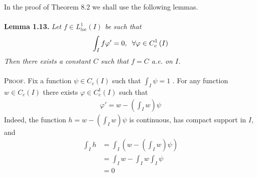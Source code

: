 \documentclass[a4paper,oneside]{book}
\numberwithin{equation}{chapter}
\begin{document}
In the proof of Theorem 8.2 we shall use the following lemmas.\\
\\
\textbf{Lemma 1.13.} \textit{Let $f\in L_{loc}^1\left(I\right)$ be such that}
\begin{align}
\label{1.65}
\int_I {f\varphi '}  = 0,\hspace{0.2cm}\forall \varphi  \in C_c^1\left( I \right)
\end{align}
\textit{Then there exists a constant $C$ such that $f=C$ a.e. on $I$.}\\
\\
\textsc{Proof.} Fix a function $\psi  \in {C_c}\left( I \right)$ such that $\int_I \psi   = 1$ . For any function $w\in C_c\left(I\right)$ there exists $\varphi \in C_c^1\left(I\right)$ such that
\begin{align}
\varphi ' = w - \left( {\int_I w } \right)\psi 
\end{align}
Indeed, the function $h=w - \left( {\int_I w } \right)\psi $ is continuous, has compact support in $I$, and
\begin{align}
\int_I h  &= \int_I {\left( {w - \left( {\int_I w } \right)\psi } \right)} \\
& = \int_I w  - \int_I w \int_I \psi  \\
& = 0
\end{align}
\end{document}
